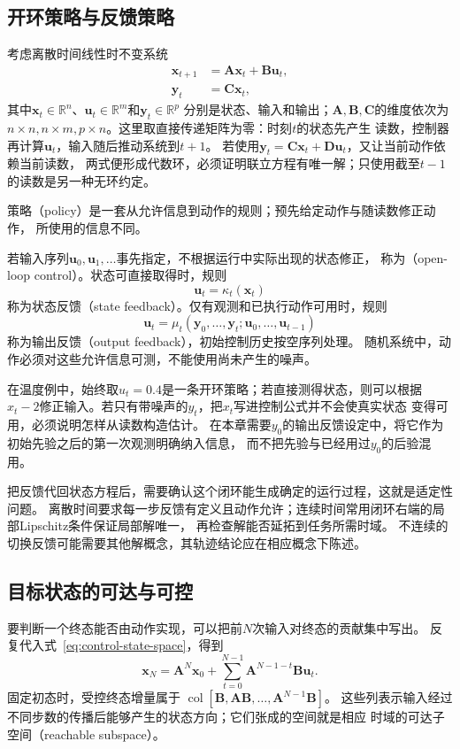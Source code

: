 \subsection{开环策略与反馈策略}
考虑离散时间线性时不变系统
\begin{equation}
  \begin{aligned}
    \bm{x}_{t+1}&=\bm{A}\bm{x}_t+\bm{B}\bm{u}_t,\\
    \bm{y}_t&=\bm{C}\bm{x}_t,
  \end{aligned}
  \label{eq:control-state-space}
\end{equation}
其中$\bm{x}_t\in\mathbb R^n$、$\bm{u}_t\in\mathbb R^m$和$\bm{y}_t\in\mathbb R^p$
分别是状态、输入和输出；$\bm A,\bm B,\bm C$的维度依次为
$n\times n,n\times m,p\times n$。这里取直接传递矩阵为零：时刻$t$的状态先产生
读数，控制器再计算$\bm u_t$，输入随后推动系统到$t+1$。
若使用$\bm y_t=\bm C\bm x_t+\bm D\bm u_t$，又让当前动作依赖当前读数，
两式便形成代数环，必须证明联立方程有唯一解；只使用截至$t-1$的读数是另一种无环约定。

策略（policy）是一套从允许信息到动作的规则；预先给定动作与随读数修正动作，
所使用的信息不同。
\begin{definition}[开环控制与反馈控制]
\label{def:control-open-loop-state-output-feedback}
若输入序列$\bm u_0,\bm u_1,\ldots$事先指定，不根据运行中实际出现的状态修正，
称为（open-loop control）。状态可直接取得时，规则
\[
  \bm u_t=\kappa_t(\bm x_t)
\]
称为状态反馈（state feedback）。仅有观测和已执行动作可用时，规则
\[
  \bm u_t=\mu_t(\bm y_0,\ldots,\bm y_t;\bm u_0,\ldots,\bm u_{t-1})
\]
称为输出反馈（output feedback），初始控制历史按空序列处理。
随机系统中，动作必须对这些允许信息可测，不能使用尚未产生的噪声。
\end{definition}

在温度例中，始终取$u_t=0.4$是一条开环策略；若直接测得状态，则可以根据
$x_t-2$修正输入。若只有带噪声的$y_t$，把$x_t$写进控制公式并不会使真实状态
变得可用，必须说明怎样从读数构造估计。
在本章需要$y_0$的输出反馈设定中，将它作为初始先验之后的第一次观测明确纳入信息，
而不把先验与已经用过$y_0$的后验混用。

把反馈代回状态方程后，需要确认这个闭环能生成确定的运行过程，这就是适定性问题。
离散时间要求每一步反馈有定义且动作允许；连续时间常用闭环右端的局部Lipschitz条件保证局部解唯一，
再检查解能否延拓到任务所需时域。
不连续的切换反馈可能需要其他解概念，其轨迹结论应在相应概念下陈述。

\subsection{目标状态的可达与可控}
要判断一个终态能否由动作实现，可以把前$N$次输入对终态的贡献集中写出。
反复代入式~\eqref{eq:control-state-space}，得到
\begin{equation}
  \bm x_N=\bm A^N\bm x_0+
  \sum_{t=0}^{N-1}\bm A^{N-1-t}\bm B\bm u_t.
  \label{eq:control-reachability-unrolling}
\end{equation}
固定初态时，受控终态增量属于
$\operatorname{col}[\bm B,\bm A\bm B,\ldots,\bm A^{N-1}\bm B]$。
这些列表示输入经过不同步数的传播后能够产生的状态方向；它们张成的空间就是相应
时域的可达子空间（reachable subspace）。

